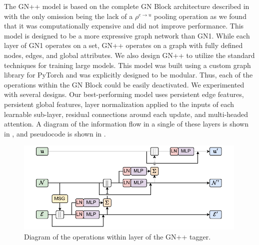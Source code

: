 The GN++ model is based on the complete GN Block architecture described in  with the only omission being the lack of a $\rho^{e \to u}$ pooling operation as we found that it was computationally expensive and did not improve performance.
This model is designed to be a more expressive graph network than GN1.
While each layer of GN1 operates on a set, GN++ operates on a graph with fully defined nodes, edges, and global attributes.
We also design GN++ to utilize the standard techniques for training large models.
This model was built using a custom graph library for PyTorch and was explicitly designed to be modular.
Thus, each of the operations within the GN Block could be easily deactivated.
We experimented with several designs.
Our best-performing model uses persistent edge features, persistent global features, layer normalization applied to the inputs of each learnable sub-layer, residual connections around each update, and multi-headed attention.
A diagram of the information flow in a single of these layers is shown in , and pseudocode is shown in .

\begin{figure}[h!]
    \centering
    \includegraphics[width=0.99\textwidth]{figures/flavour_tagging/gnpp.pdf}
    \caption{Diagram of the operations within layer of the GN++ tagger.}
    \label{fig:gnpp_graph}
\end{figure}

